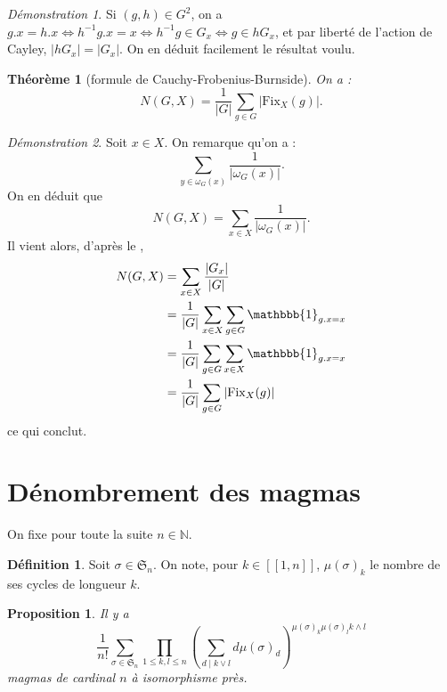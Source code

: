 \documentclass{article}
\newtheorem*{theoreme}{Théorème}
\newtheorem*{proposition}{Proposition}
\theoremstyle{definition}
\newtheorem*{definition}{Définition}
\theoremstyle{remark}
\newtheorem*{demonstration}{Démonstration}
\begin{document}
\begin{demonstration}
    Si $(g,h)\in G^2$, on a $g.x=h.x\Leftrightarrow h^{-1}g.x=x\Leftrightarrow h^{-1}g\in G_x\Leftrightarrow g\in hG_x$, et par liberté de l'action de Cayley, $|hG_x|=|G_x|$. On en déduit facilement le résultat voulu.
\end{demonstration}

\begin{theoreme}[formule de Cauchy-Frobenius-Burnside]
    On a :
    $$N(G,X)=\frac{1}{|G|}\sum_{g\in G}|\mathrm{Fix}_X(g)|.$$
\end{theoreme}

\begin{demonstration}
    Soit $x\in X$. On remarque qu'on a :
    $$\sum_{y\in\omega_G(x)}\frac{1}{|\omega_G(x)|}.$$
    On en déduit que
    $$N(G,X)=\sum_{x\in X}\frac{1}{|\omega_G(x)|}.$$
    Il vient alors, d'après le ,
    \begin{align*}
        N(G,X)&=\sum_{x\in X}\frac{|G_x|}{|G|}\\
        &=\frac1{|G|}\sum_{x\in X}\sum_{g\in G}\mathbbb{1}_{g.x=x}\\
        &=\frac1{|G|}\sum_{g\in G}\sum_{x\in X}\mathbbb{1}_{g.x=x}\\
        &=\frac{1}{|G|}\sum_{g\in G}|\mathrm{Fix}_X(g)|
    \end{align*}
    ce qui conclut.
\end{demonstration}

\section{Dénombrement des magmas}

On fixe pour toute la suite $n\in\mathbb N$.

\begin{definition}
    Soit $\sigma\in\mathfrak S_n$. On note, pour $k\in[\![1,n]\!]$, $\mu(\sigma)_k$ le nombre de ses cycles de longueur $k$.
\end{definition}

\begin{proposition}
Il y a
$$\frac{1}{n!}\sum_{\sigma\in\mathfrak S_n}\prod_{1\leq k,l\leq n}\left(\sum_{d\mid k\lor l}d\mu(\sigma)_d\right)^{\mu(\sigma)_k\mu(\sigma)_lk\land l}$$
magmas de cardinal $n$ à isomorphisme près.
\end{proposition}
\end{document}
